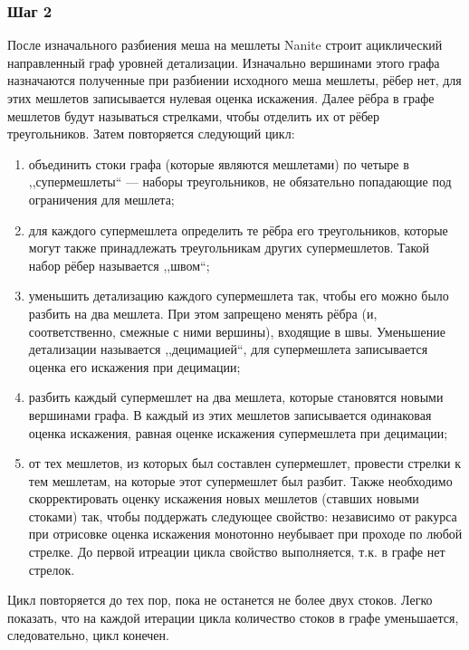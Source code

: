 \subsubsection*{Шаг 2}
После изначального разбиения меша на мешлеты Nanite строит ациклический направленный граф уровней детализации.
Изначально вершинами этого графа назначаются полученные при разбиении исходного меша мешлеты, рёбер нет, для этих мешлетов записывается нулевая оценка искажения.
Далее рёбра в графе мешлетов будут называться стрелками, чтобы отделить их от рёбер треугольников.
Затем повторяется следующий цикл:
\begin{enumerate}
    \item объединить стоки графа (которые являются мешлетами) по четыре в ,,супермешлеты`` --- наборы треугольников, не обязательно попадающие под ограничения для мешлета;
    \item для каждого супермешлета определить те рёбра его треугольников, которые могут также принадлежать треугольникам других супермешлетов.
    Такой набор рёбер называется ,,швом``;
    \item уменьшить детализацию каждого супермешлета так, чтобы его можно было разбить на два мешлета.
    При этом запрещено менять рёбра (и, соответственно, смежные с ними вершины), входящие в швы.
    Уменьшение детализации называется ,,децимацией``, для супермешлета записывается оценка его искажения при децимации;
    \item разбить каждый супермешлет на два мешлета, которые становятся новыми вершинами графа.
    В каждый из этих мешлетов записывается одинаковая оценка искажения, равная оценке искажения супермешлета при децимации;
    \item от тех мешлетов, из которых был составлен супермешлет, провести стрелки к тем мешлетам, на которые этот супермешлет был разбит.
    Также необходимо скорректировать оценку искажения новых мешлетов (ставших новыми стоками) так, чтобы поддержать следующее свойство: независимо от ракурса при отрисовке оценка искажения монотонно неубывает при проходе по любой стрелке.
    До первой итреации цикла свойство выполняется, т.к. в графе нет стрелок.
\end{enumerate}
Цикл повторяется до тех пор, пока не останется не более двух стоков.
Легко показать, что на каждой итерации цикла количество стоков в графе уменьшается, следовательно, цикл конечен.

